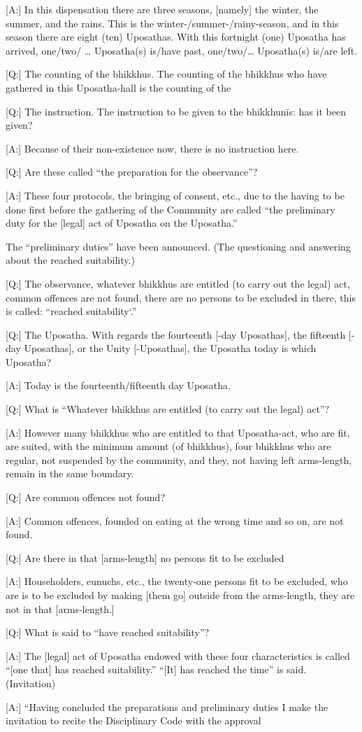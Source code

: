[A:] In this dispensation there are three seasons, [namely] the winter,
the summer, and the rains.
This is the winter-/summer-/rainy-season, and in this season there are
eight (ten) Uposathas. With this fortnight (one) Uposatha has arrived,
one/two/ … Uposatha(s) is/have past, one/two/… Uposatha(s) is/are
left.

[Q:] The counting of the bhikkhus. The counting of the bhikkhus
who have gathered in this Uposatha-hall is the counting of the

[Q:] The instruction. The instruction to be given to the bhikkhunīs:
has it been given?

[A:] Because of their non-existence now, there is no instruction here.

[Q:] Are these called “the preparation for the observance”?

[A:] These four protocols, the bringing of consent, etc., due to the
having to be done first before the gathering of the Community are
called “the preliminary duty for the [legal] act of Uposatha on the
Uposatha.”

The “preliminary duties” have been announced.
(The questioning and answering about the reached suitability.)

[Q:] The observance, whatever bhikkhus are entitled (to carry out the
legal) act, common offences are not found, there are no persons to be
excluded in there, this is called: “reached suitability`.”

[Q:] The Uposatha. With regards the fourteenth [-day Uposathas], the
fifteenth [-day Uposathas], or the Unity [-Uposathas], the Uposatha
today is which Uposatha?

[A:] Today is the fourteenth/fifteenth day Uposatha.

[Q:] What is “Whatever bhikkhus are entitled (to carry out the legal)
act”?

[A:] However many bhikkhus who are entitled to that Uposatha-act,
who are fit, are suited, with the minimum amount (of bhikkhus), four
bhikkhus who are regular, not suspended by the community, and
they, not having left arms-length, remain in the same boundary.

[Q:] Are common offences not found?

[A:] Common offences, founded on eating at the wrong time and so
on, are not found.

[Q:] Are there in that [arms-length] no persons fit to be excluded

[A:] Householders, eunuchs, etc., the twenty-one persons fit to be
excluded, who are is to be excluded by making [them go] outside from
the arms-length, they are not in that [arms-length.]

[Q:] What is said to “have reached suitability”?

[A:] The [legal] act of Uposatha endowed with these four
characteristics is called “[one that] has reached suitability.” “[It] has
reached the time” is said.
(Invitation)

[A:] “Having concluded the preparations and preliminary duties I
make the invitation to recite the Disciplinary Code with the approval
